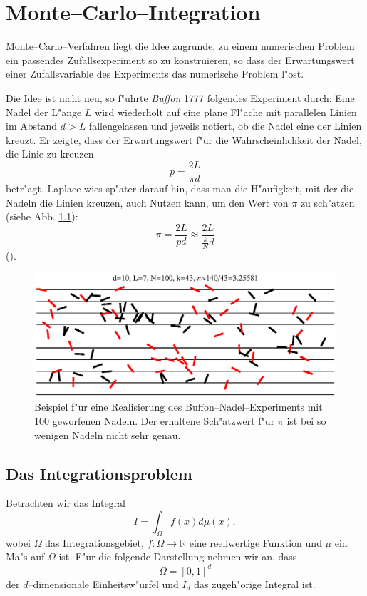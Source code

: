 	\chapter{Monte--Carlo--Integration}\label{chapter:mc_integration}
	Monte--Carlo--Verfahren liegt die Idee zugrunde, zu einem numerischen Problem ein passendes Zufallsexperiment so zu konstruieren, so dass der Erwartungswert einer Zufallsvariable des Experiments das numerische Problem l"ost.
	
	Die Idee ist nicht neu, so f"uhrte {\em Buffon} 1777 folgendes Experiment durch: Eine Nadel der L"ange $L$ wird wiederholt auf eine plane Fl"ache mit parallelen Linien im Abstand $d>L$ fallengelassen und jeweils notiert, ob die Nadel eine der Linien kreuzt. Er zeigte, dass der Erwartungswert f"ur die Wahrscheinlichkeit der Nadel, die Linie zu kreuzen $$p=\frac{2L}{\pi d}$$ betr"agt. Laplace wies sp"ater darauf hin, dass  man die H"aufigkeit, mit der die Nadeln die Linien kreuzen, auch Nutzen kann, um den Wert von $\pi$ zu sch"atzen (siehe Abb. \ref{fig:buffon}): $$\pi=\frac{2L}{p d}\approx \frac{2L}{\frac{k}{N}d}$$
	().
	\begin{figure}
		\centering
		\includegraphics[height=0.3\textheight]{buffonsneedles.eps}
		\caption{Beispiel f"ur eine Realisierung des Buffon--Nadel--Experiments mit 100 geworfenen Nadeln. Der erhaltene Sch"atzwert f"ur $\pi$ ist bei so wenigen Nadeln nicht sehr genau.}
		\label{fig:buffon}
	\end{figure}
	
	\section{Das Integrationsproblem}\label{subsec:integrationsproblem}
	Betrachten wir das Integral
	\begin{equation}
		I=\int_\Omega f(x) d\mu(x),
		\label{eq:integration_problem}
	\end{equation}
	wobei $\Omega$ das Integrationsgebiet, $f : \Omega \to \mathbb{R}$ eine reellwertige Funktion und $\mu$ ein Ma"s auf $\Omega$ ist. F"ur die folgende Darstellung nehmen wir an, dass $$\Omega=[0,1]^d$$ der $d$--dimensionale Einheitsw"urfel und $I_d$ das zugeh"orige Integral ist.
